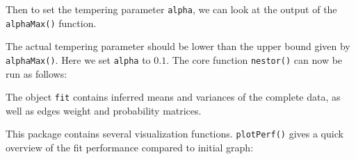 \begin{Shaded}
\begin{Highlighting}[]
\StringTok{ }\OperatorTok{\$}\NormalTok{ )}
\end{Highlighting}
\end{Shaded}

Then to set the tempering parameter \texttt{alpha}, we can look at the
output of the \texttt{alphaMax()} function.

\begin{Shaded}
\begin{Highlighting}[]
\OperatorTok{+}
\end{Highlighting}
\end{Shaded}

The actual tempering parameter should be lower than the upper bound
given by \texttt{alphaMax()}. Here we set \texttt{alpha} to \(0.1\). The
core function \texttt{nestor()} can now be run as follows:

\begin{Shaded}
\begin{Highlighting}[]
\StringTok{ }\OperatorTok{\$}\NormalTok{, }\NormalTok{, }
           \NormalTok{)}
\CommentTok{#> }
\end{Highlighting}
\end{Shaded}

The object \texttt{fit} contains inferred means and variances of the
complete data, as well as edges weight and probability matrices.

This package contains several visualization functions.
\texttt{plotPerf()} gives a quick overview of the fit performance
compared to initial graph:

\begin{Shaded}
\begin{Highlighting}[]
\OperatorTok{\$}\OperatorTok{\$}\NormalTok{)}
\end{Highlighting}
\end{Shaded}

